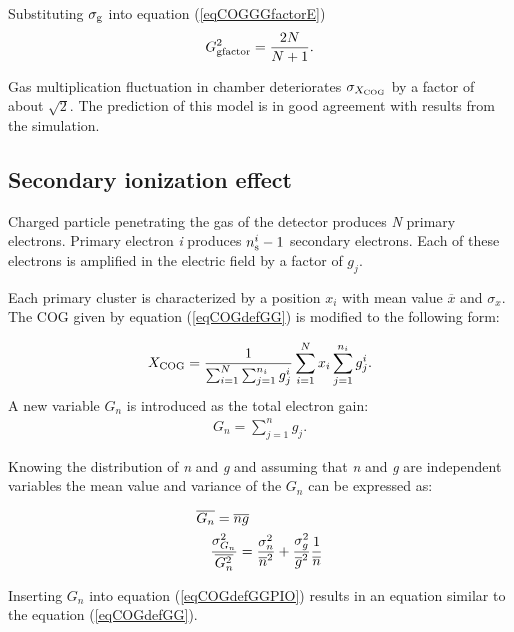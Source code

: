 \documentclass[a4paper,12pt]{article}
\begin{document}
Substituting $\sigma_{\rm{g}}$ into equation
(\ref{eqCOGGGfactorE})
\begin{eqnarray}
    G_{\rm{gfactor}}^2 =\frac{2N}{N+1}.
\label{eqCOGGGfactorR}
\end{eqnarray}

Gas multiplication fluctuation in chamber  deteriorates
$\sigma_{X_{\rm{COG}}}$  by a factor of about ${\sqrt{2}}$. The
prediction of this model is in good agreement with results from
the simulation.


\subsection{Secondary ionization effect}

Charged particle penetrating the gas of the detector produces
{\it{N}} primary electrons. Primary electron {\it{i}} produces
$n_{\rm{s}}^i-1$ secondary electrons. Each of these electrons is
amplified in the electric field by a factor of $g_j$.

Each primary cluster is characterized by a position $x_i$ with
mean value $\overline{x}$ and $\sigma_x$. The COG given by
equation (\ref{eqCOGdefGG}) is modified to the following form:

\begin{eqnarray}
    X_{\rm{COG}}=\frac{1}{\sum_{i=1}^N\sum_{j=1}^{n_i}{g_j^{i}}}
    \sum_{i=1}^{N}{x_i}\sum_{j=1}^{n_i}{g_j^{i}}.
\label{eqCOGdefGGPIO}
\end{eqnarray}
A new variable $G_n$ is introduced as the total electron gain:
\begin{eqnarray}
    G_n=\sum_{j=1}^{n}{g_j}.
\label{eqGNdef}
\end{eqnarray}


Knowing the distribution of {\it{n}} and {\it{g}} and assuming
that {\it{n}} and {\it{g}} are independent variables  the mean
value and variance of the $G_n$ can be expressed as:

\begin{eqnarray}
    \lefteqn{
    \overline{G_n}=\overline{n}\overline{g}} \\
    &&{}
    \frac{\sigma^2_{G_n}}{\overline{G_n^2}}=
    \frac{\sigma^2_n}{\overline{n}^2}+
    \frac{\sigma^2_g}{\overline{g}^2}
    \frac{1}{\overline{n}}
\label{eqGNsigma}
\end{eqnarray}

Inserting $G_n$ into equation (\ref{eqCOGdefGGPIO}) results in an
equation similar to the equation (\ref{eqCOGdefGG}).
\end{document}
